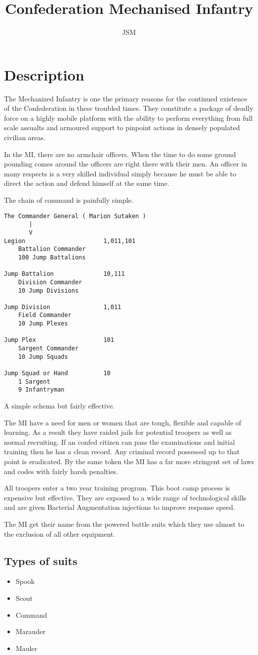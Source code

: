 \documentclass{article}
\begin{document}
\title{Confederation Mechanised Infantry}
\author{JSM}
\maketitle
\section{Description}

The Mechanized Infantry is one the primary reasons for the continued 
existence of the Confederation in these troubled times. They 
constitute a package of deadly force on a highly mobile platform with 
the ability to perform everything from full scale assualts and 
armoured support to pinpoint actions in densely populated civilian 
areas.

In the MI, there are no armchair officers. When the time to do some
ground pounding comes around the officers are right there with their 
men. An officer in many respects is a very skilled individual simply 
because he must be able to direct the action and defend himself at 
the same time. 

The chain of command is painfully simple. 

\begin{verbatim}
The Commander General ( Marion Sutaken )
       |
	   V	
Legion						1,011,101	
	Battalion Commander
	100 Jump Battalions   

Jump Battalion				10,111
	Division Commander           
    10 Jump Divisions      

Jump Division               1,011 
	Field Commander
	10 Jump Plexes	      

Jump Plex					101
	Sargent Commander         
    10 Jump Squads		    

Jump Squad or Hand			10 
	1 Sargent                
    9 Infantryman       	 
\end{verbatim}

A simple schema but fairly effective. 

The MI have a need for men or women that are tough, flexible and 
capable of learning. As a result they have raided jails for potential 
troopers as well as normal recruiting. If an confed citizen can pass 
the examinations and initial training then he has a clean record. Any 
criminal record possessed up to that point is eradicated. By the same 
token the MI has a far more stringent set of laws and codes with 
fairly harsh penalties. 

All troopers enter a two year training program. This boot camp 
process is expensive but effective. They are exposed to a wide range 
of technological skills and are given Bacterial Augmentation 
injections to improve response speed. 

The MI get their name from the powered battle suits which they use almost
to the exclusion of all other equipment. 

\subsection{Types of suits}

\begin{itemize}
	\item Spook
	\item Scout
	\item Command
	\item Marauder
	\item Mauler
\end{itemize}
\end{document}
